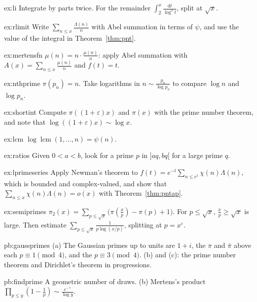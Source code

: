 \begin{hint}{ex:li}
Integrate by parts twice. For the remainder $\int_2^x\frac{\mathrm dt}{\log^3t}$, split at $\sqrt x$.
\end{hint}
\begin{hint}{ex:rlimit}
Write $\sum_{n\le x}\frac{\Lambda(n)}n$ with Abel summation in terms of $\psi$, and use the value of the integral in Theorem~\ref{thm:pnt}.
\end{hint}
\begin{hint}{ex:mertensfn}
$\mu(n)=n\cdot\frac{\mu(n)}n$: apply Abel summation with $A(x)=\sum_{n\le x}\frac{\mu(n)}n$ and $f(t)=t$.
\end{hint}
\begin{hint}{ex:nthprime}
$\pi(p_n)=n$. Take logarithms in $n\sim\frac{p_n}{\log p_n}$ to compare $\log n$ and $\log p_n$.
\end{hint}
\begin{hint}{ex:shortint}
Compute $\pi((1+\varepsilon)x)$ and $\pi(x)$ with the prime number theorem, and note that $\log((1+\varepsilon)x)\sim\log x$.
\end{hint}
\begin{hint}{ex:lcm}
$\log\operatorname{lcm}(1,\dots,n)=\psi(n)$.
\end{hint}
\begin{hint}{ex:ratios}
Given $0<a<b$, look for a prime $p$ in $]aq,bq[$ for a large prime $q$.
\end{hint}
\begin{hint}{ex:lprimeseries}
Apply Newman's theorem to $f(t)=e^{-t}\sum_{n\le e^t}\chi(n)\Lambda(n)$, which is bounded and complex-valued, and show that $\sum_{n\le x}\chi(n)\Lambda(n)=o(x)$ with Theorem~\ref{thm:pntap}.
\end{hint}
\begin{hint}{ex:semiprimes}
$\pi_2(x)=\sum_{p\le\sqrt x}\bigl(\pi(\frac xp)-\pi(p)+1\bigr)$. For $p\le\sqrt x$, $\frac xp\ge\sqrt x$ is large. Then estimate $\sum_{p\le\sqrt x}\frac1{p\log(x/p)}$, splitting at $p=x^\varepsilon$.
\end{hint}

\begin{hint}{pb:gaussprimes}
(a) The Gaussian primes up to units are $1+i$, the $\pi$ and $\bar\pi$ above each $p\equiv1\pmod4$, and the $p\equiv3\pmod4$. (b)
and (c): the prime number theorem and Dirichlet's theorem in progressions.
\end{hint}

\begin{hint}{pb:findprime}
A geometric number of draws. (b) Mertens's product $\prod_{p\le y}(1-\frac1p)\sim\frac{e^{-\gamma}}{\log y}$.
\end{hint}

